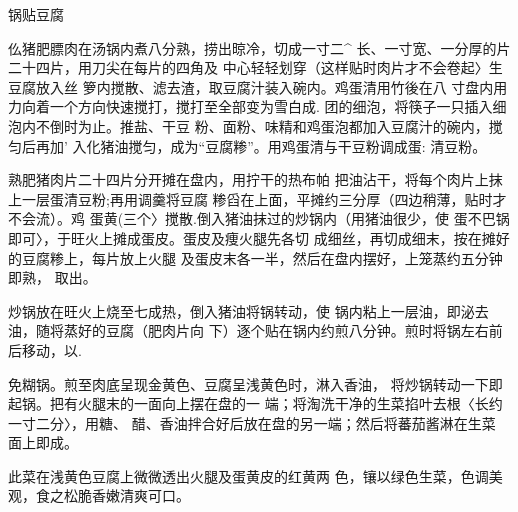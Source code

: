 \begin{recipe}{锅贴豆腐}

\ingredients



\cooking

仫猪肥膘肉在汤锅内煮八分熟，捞出晾冷，切成一寸二^ 长、一寸宽、一分厚的片二十四片，用刀尖在每片的四角及 中心轻轻划穿（这样贴时肉片才不会卷起〉生豆腐放入丝 箩内搅散、滤去渣，取豆腐汁装入碗内。鸡蛋清用竹後在八 寸盘内用力向着一个方向快速搅打，搅打至全部变为雪白成. 团的细泡，将筷子一只插入细泡内不倒时为止。推盐、干豆 粉、面粉、味精和鸡蛋泡都加入豆腐汁的碗内，搅匀后再加' 入化猪油搅匀，成为“豆腐糁”。用鸡蛋清与干豆粉调成蛋: 清豆粉。

\step 	熟肥猪肉片二十四片分开摊在盘内，用拧干的热布帕 把油沾干，将每个肉片上抹上一层蛋清豆粉;再用调羹将豆腐 糁舀在上面，平摊约三分厚（四边稍薄，贴时才不会流）。鸡 蛋黄(三个〉搅散.倒入猪油抹过的炒锅内（用猪油很少，使 蛋不巴锅即可〉，于旺火上摊成蛋皮。蛋皮及痩火腿先各切 成细丝，再切成细末，按在摊好的豆腐糁上，每片放上火腿 及蛋皮末各一半，然后在盘内摆好，上笼蒸约五分钟即熟， 取出。

\step 	炒锅放在旺火上烧至七成热，倒入猪油将锅转动，使 锅内粘上一层油，即泌去油，随将蒸好的豆腐（肥肉片向 下）逐个贴在锅内约煎八分钟。煎时将锅左右前后移动，以.

免糊锅。煎至肉底呈现金黄色、豆腐呈浅黄色时，淋入香油， 将炒锅转动一下即起锅。把有火腿末的一面向上摆在盘的一 端；将淘洗干净的生菜掐叶去根〈长约一寸二分〉，用糖、 醋、香油拌合好后放在盘的另一端；然后将蕃茄酱淋在生菜 面上即成。

\notes

此菜在浅黄色豆腐上微微透出火腿及蛋黄皮的红黄两 色，镶以绿色生菜，色调美观，食之松脆香嫩清爽可口。

\end{recipe}

